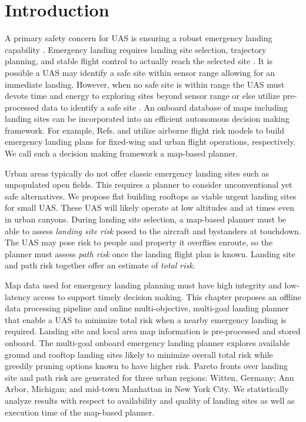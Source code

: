\section{Introduction}

A primary safety concern for \ac{UAS} is ensuring a robust emergency landing capability \cite{winnefeld_unmanned_2011, degarmo_issues_2013}.  Emergency landing requires landing site selection, trajectory planning, and stable flight control to actually reach the selected site \cite{atkins_emergency_2006}. It is possible a \ac{UAS} may identify a safe site within sensor range allowing for an immediate landing.  However, when no safe site is within range the \ac{UAS} must devote time and energy to exploring sites beyond sensor range or else utilize pre-processed data to identify a safe site \cite{ten_harmsel_emergency_2017, ochoa_fail-safe_2017}.  An onboard database of maps including landing sites can be incorporated into an efficient autonomous decision making framework.  For example, Refs.  \cite{atkins_emergency_2006, meuleau_emergency_2009}  and \cite{sankararaman_towards_2017} utilize airborne flight risk models to build emergency landing plans for fixed-wing and urban flight operations, respectively. We call such a decision making framework a map-based planner.

Urban areas typically do not offer classic emergency landing sites such as unpopulated open fields. This requires a planner to consider unconventional yet safe alternatives. We propose flat building rooftops as viable urgent landing sites for small UAS.  These \ac{UAS} will likely operate at low altitudes and at times even in urban canyons. During landing site selection, a map-based planner must be able to assess \emph{landing site risk} posed to the aircraft and bystanders at touchdown. The \ac{UAS} may pose risk to people and property it overflies enroute, so the planner must assess \emph{path risk} once the landing flight plan is known.  Landing site and path risk together offer an estimate of \emph{total risk}.

Map data used for emergency landing planning must have high integrity and low-latency access to support timely decision making. This chapter proposes an offline data processing pipeline and online multi-objective, multi-goal landing planner that enable a \ac{UAS} to minimize total risk when a nearby emergency landing is required. Landing site and local area map information is pre-processed and stored onboard.  The multi-goal onboard emergency landing planner explores available ground and rooftop landing sites likely to minimize overall total risk while greedily pruning options known to have higher risk.   Pareto fronts over landing site and path risk are generated for three urban regions: Witten, Germany; Ann Arbor, Michigan; and mid-town Manhattan in New York City. We statistically analyze results with respect to availability and quality of landing sites as well as execution time of the map-based planner.

